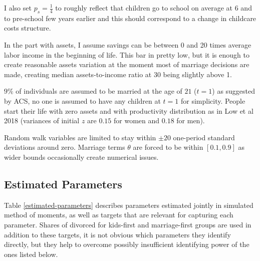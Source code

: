 \documentclass[12pt,letter]{article}
\begin{document}
I also set $p_s = \frac14$ to roughly reflect that children go to school on average at 6 and to pre-school few years earlier and this should correspond to a change in childcare costs structure.

In the part with assets, I assume savings can be between 0 and 20 times average labor income in the beginning of life. This bar in pretty low, but it is enough to create reasonable assets variation at the moment most of marriage decisions are made, creating median assets-to-income ratio at 30 being slightly above 1.

$9\%$ of individuals are assumed to be married at the age of $21$ ($t = 1$) as suggested by ACS, no one is assumed to have any children at $t = 1$ for simplicity. People start their life with zero assets and with productivity distribution as in Low et al 2018 (variances of initial $z$ are $0.15$ for women and $0.18$ for men). 

Random walk variables are limited to stay within $\pm 20$ one-period standard deviations around zero. Marriage terms $\theta$ are forced to be within $[0.1,0.9]$ as wider bounds occasionally create numerical issues. 

\subsection{Estimated Parameters}
Table \ref{estimated-parameters} describes parameters estimated jointly in simulated method of moments, as well as targets that are relevant for capturing each parameter. Shares of divorced for kids-first and marriage-first groups are used in addition to these targets, it is not obvious which parameters they identify directly, but they help to overcome possibly insufficient identifying power of the ones listed below. 
\end{document}
